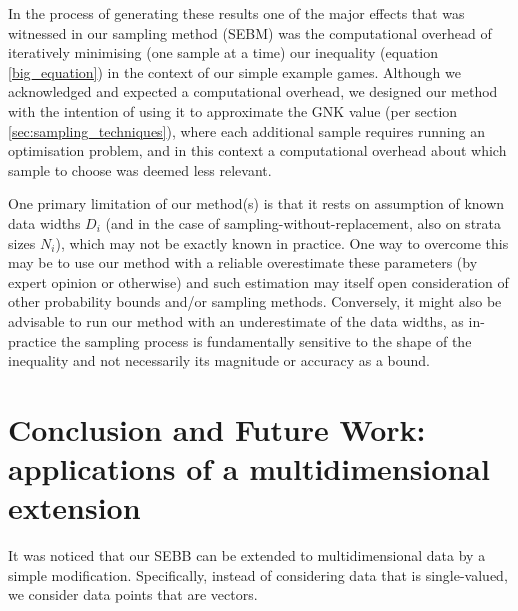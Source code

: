 In the process of generating these results one of the major effects that was witnessed in our sampling method (SEBM) was the computational overhead of iteratively minimising (one sample at a time) our inequality (equation \ref{big_equation}) in the context of our simple example games.
Although we acknowledged and expected a computational overhead, we designed our method with the intention of using it to approximate the GNK value (per section \ref{sec:sampling_techniques}), where each additional sample requires running an optimisation problem, and in this context a computational overhead about which sample to choose was deemed less relevant.


% 

One primary limitation of our method(s) is that it rests on assumption of known data widths $D_i$ (and in the case of sampling-without-replacement, also on strata sizes $N_i$), which may not be exactly known in practice.
One way to overcome this may be to use our method with a reliable overestimate these parameters (by expert opinion or otherwise) and such estimation may itself open consideration of other probability bounds and/or sampling methods.
Conversely, it might also be advisable to run our method with an underestimate of the data widths, as in-practice the sampling process is fundamentally sensitive to the shape of the inequality and not necessarily its magnitude or accuracy as a bound.








\section{Conclusion and Future Work: applications of a multidimensional extension}\label{sec:multi}

It was noticed that our SEBB can be extended to multidimensional data by a simple modification.
Specifically, instead of considering data that is single-valued, we consider data points that are vectors. 

